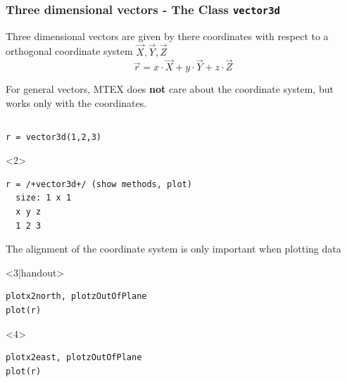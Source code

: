\documentclass[compress]{beamer}
\begin{document}
\begin{frame}[fragile]
  \frametitle{Three dimensional vectors - The \MTEX Class \texttt{\bf vector3d}}

  \begin{overlayarea}{\textwidth}{8cm}
  Three dimensional vectors are given by there coordinates with respect to a
  orthogonal coordinate system $\vec X, \vec Y, \vec Z$
  \begin{equation*}
    \vec r = x \cdot \vec X + y \cdot \vec Y + z \cdot \vec Z
  \end{equation*}

  \pause

  For general vectors, MTEX does \textbf{not} care about the coordinate system, but
  works only with the coordinates.

  \begin{columns}
    \begin{column}{8cm}

      \begin{lstlisting}[style=input]
r = vector3d(1,2,3)
  \end{lstlisting}
      \begin{onlyenv}<2>
        \vspace{-0.3cm}
\begin{lstlisting}[style=output]
r = /+vector3d+/ (show methods, plot)
  size: 1 x 1
  x y z
  1 2 3
\end{lstlisting}
      \end{onlyenv}


      \pause
      \medskip

      The alignment of the coordinate system is only important when plotting
      data
      \begin{onlyenv}<3|handout>
\begin{lstlisting}[style=input]
plotx2north, plotzOutOfPlane
plot(r)
\end{lstlisting}
      \end{onlyenv}
      \begin{onlyenv}<4>
\begin{lstlisting}[style=input]
plotx2east, plotzOutOfPlane
plot(r)
\end{lstlisting}
      \end{onlyenv}


\end{column}
\end{columns}
\end{overlayarea}
\end{frame}
\end{document}
